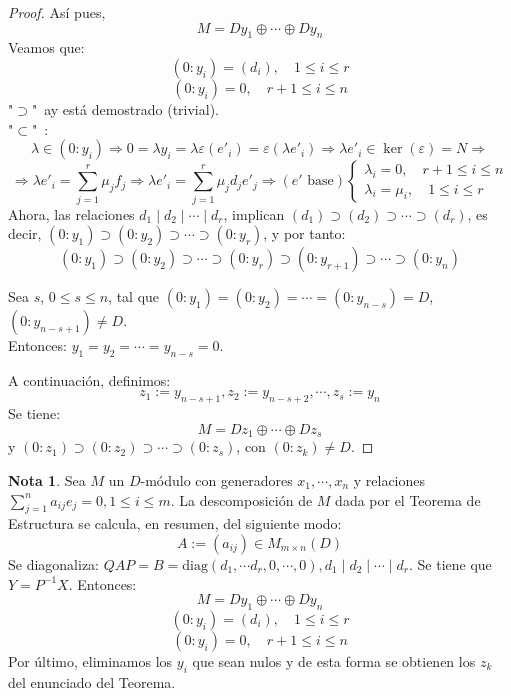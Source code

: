\documentclass{article}
\theoremstyle{theorem-style}  %
\theoremstyle{definition}
\newtheorem*{note}{Nota} %
\theoremstyle{example-style}
\begin{document}
\begin{proof}
		Así pues,
		\[ M=Dy_1 \oplus \cdots \oplus Dy_n\]
		Veamos que:
		\[ (0:y_i)=(d_i), \quad  1 \leq i \leq r\]
		\[ (0:y_i)=0, \quad  r+1 \leq i \leq n\]
		"$ \supset $"\ ay está demostrado (trivial).\\
		"$ \subset $"\  :\[ \lambda \in (0:y_i) \Rightarrow 0=\lambda y_i =\lambda \varepsilon(e'_i)= \varepsilon(\lambda e'_i) \Rightarrow \lambda e'_i \in \ker(\varepsilon)=N\Rightarrow \]
		\[\Rightarrow\lambda e'_i = \sum_{j=1}^{r}\mu_jf_j \Rightarrow \lambda e'_i = \sum_{j=1}^{r} \mu_j d_j e'_j \Rightarrow (e' \text{ base})\begin{cases}
		\lambda_i=0, \quad  r+1 \leq i \leq n \\
		\lambda_i=\mu_i, \quad 1 \leq i \leq r
		\end{cases} \]
		Ahora, las relaciones $ d_1 \mid d_2 \mid \cdots \mid d_r $, implican $ (d_1)\supset (d_2) \supset \cdots \supset (d_r) $, es decir, $ (0:y_1)\supset(0:y_2)\supset\cdots\supset(0:y_r) $, y por tanto:
		\[ (0:y_1)\supset(0:y_2)\supset\cdots\supset(0:y_r)\supset(0:y_{r+1})\supset\cdots\supset(0:y_n)\]

		Sea $ s $, $ 0 \leq s \leq n $, tal que $ (0:y_1)=(0:y_2)=\cdots =(0:y_{n-s})=D $, $ (0:y_{n-s+1})\neq D $. \\Entonces: $ y_1=y_2=\cdots = y_{n-s}=0 $.

		A continuación, definimos:
		\[ z_1:=y_{n-s+1},z_2:=y_{n-s+2}, \cdots, z_s:=y_n  \]
		Se tiene:
		\[ M=Dz_1\oplus \cdots \oplus Dz_s \]
		y $ (0:z_1)\supset(0:z_2)\supset\cdots \supset(0:z_s)$, con $ (0:z_k)\neq D $.
	\end{proof}
	\begin{note}
		Sea $ M $ un $ D $-módulo con generadores $ x_1,\cdots, x_n $ y relaciones $\sum_{j=1}^{n}a_{ij}e_j=0, 1 \leq i \leq m$. La descomposición de $ M $ dada por el Teorema de Estructura se calcula, en resumen, del siguiente modo:
		\[ A:=(a_{ij}) \in M_{m \times n}(D) \]
		Se diagonaliza: $ QAP=B= \text{diag}(d_1, \cdots d_r, 0, \cdots, 0),  d_1 \mid d_2 \mid \cdots \mid d_r$. Se tiene que $ Y=P^{-1}X $. Entonces:
		\[ M=Dy_1\oplus \cdots \oplus Dy_n \]
		\[ (0:y_i)=(d_i), \quad  1 \leq i \leq r\]
		\[ (0:y_i)=0, \quad  r+1 \leq i \leq n\]
		Por último, eliminamos los $y_i$ que sean nulos y de esta forma se obtienen los $ z_k $ del enunciado del Teorema.

	\end{note}
\end{document}
